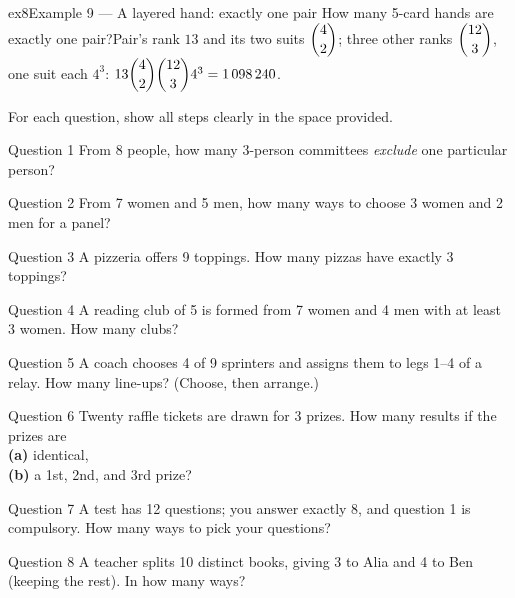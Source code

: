 \documentclass[11pt]{article}
\begin{document}
\begin{example}{ex8}{Example 9 --- A layered hand: exactly one pair}
How many 5-card hands are exactly one pair?\soln Pair's rank $13$ and its two suits $\dbinom{4}{2}$; three other ranks $\dbinom{12}{3}$, one suit each $4^3$: $13\dbinom{4}{2}\dbinom{12}{3}4^3=1\,098\,240$.
\end{example}

\clearpage
{}
For each question, show all steps clearly in the space provided.

\begin{qbox}{Question 1}
From 8 people, how many 3-person committees \emph{exclude} one particular person?\workspace{2.4cm}
\end{qbox}

\begin{qbox}{Question 2}
From 7 women and 5 men, how many ways to choose 3 women and 2 men for a panel?\workspace{2.4cm}
\end{qbox}

\begin{qbox}{Question 3}
A pizzeria offers 9 toppings. How many pizzas have exactly 3 toppings?\workspace{2.4cm}
\end{qbox}

\begin{qbox}{Question 4}
A reading club of 5 is formed from 7 women and 4 men with at least 3 women. How many clubs?\workspace{2.4cm}
\end{qbox}

\begin{qbox}{Question 5}
A coach chooses 4 of 9 sprinters and assigns them to legs 1--4 of a relay. How many line-ups? (Choose, then arrange.)\workspace{2.4cm}
\end{qbox}

\begin{qbox}{Question 6}
Twenty raffle tickets are drawn for 3 prizes. How many results if the prizes are \\ \textbf{(a)} identical, \\ \textbf{(b)} a 1st, 2nd, and 3rd prize?\workspace{2.4cm}
\end{qbox}

\begin{qbox}{Question 7}
A test has 12 questions; you answer exactly 8, and question 1 is compulsory. How many ways to pick your questions?\workspace{2.4cm}
\end{qbox}

\begin{qbox}{Question 8}
A teacher splits 10 distinct books, giving 3 to Alia and 4 to Ben (keeping the rest). In how many ways?\workspace{2.4cm}
\end{qbox}
\end{document}
